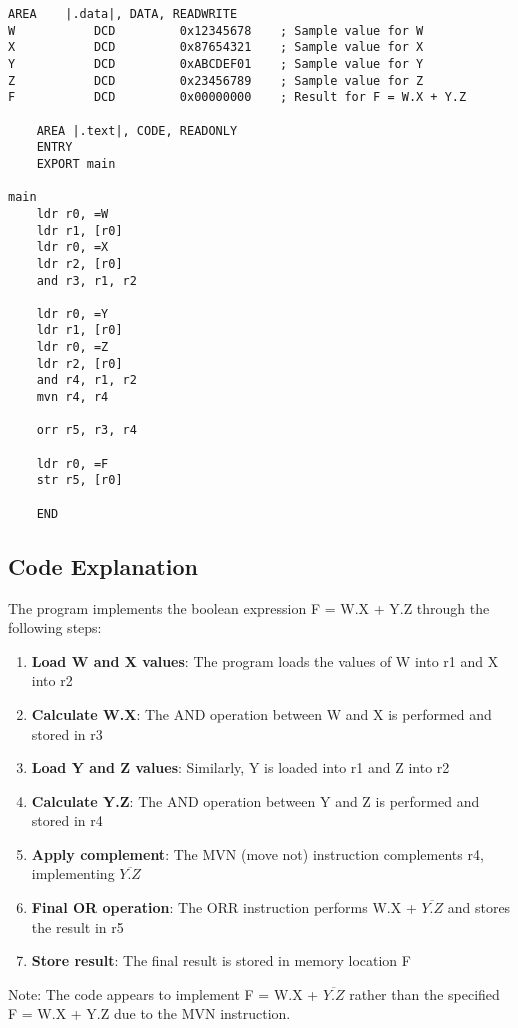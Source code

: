 \documentclass[12pt,a4paper]{article}
\begin{document}
\begin{lstlisting}[style=assembly, caption=Boolean Operation Implementation]
    AREA    |.data|, DATA, READWRITE
W           DCD         0x12345678    ; Sample value for W
X           DCD         0x87654321    ; Sample value for X
Y           DCD         0xABCDEF01    ; Sample value for Y
Z           DCD         0x23456789    ; Sample value for Z
F           DCD         0x00000000    ; Result for F = W.X + Y.Z

    AREA |.text|, CODE, READONLY
    ENTRY
    EXPORT main

main
    ldr r0, =W
    ldr r1, [r0]
    ldr r0, =X
    ldr r2, [r0]
    and r3, r1, r2

    ldr r0, =Y
    ldr r1, [r0]
    ldr r0, =Z
    ldr r2, [r0]
    and r4, r1, r2
    mvn r4, r4

    orr r5, r3, r4

    ldr r0, =F
    str r5, [r0]

    END
\end{lstlisting}

\subsection{Code Explanation}

The program implements the boolean expression F = W.X + Y.Z through the following steps:

\begin{enumerate}
    \item \textbf{Load W and X values}: The program loads the values of W into r1 and X into r2
    \item \textbf{Calculate W.X}: The AND operation between W and X is performed and stored in r3
    \item \textbf{Load Y and Z values}: Similarly, Y is loaded into r1 and Z into r2
    \item \textbf{Calculate Y.Z}: The AND operation between Y and Z is performed and stored in r4
    \item \textbf{Apply complement}: The MVN (move not) instruction complements r4, implementing $\overline{Y.Z}$
    \item \textbf{Final OR operation}: The ORR instruction performs W.X + $\overline{Y.Z}$ and stores the result in r5
    \item \textbf{Store result}: The final result is stored in memory location F
\end{enumerate}

Note: The code appears to implement F = W.X + $\overline{Y.Z}$ rather than the specified F = W.X + Y.Z due to the MVN instruction.
\end{document}
